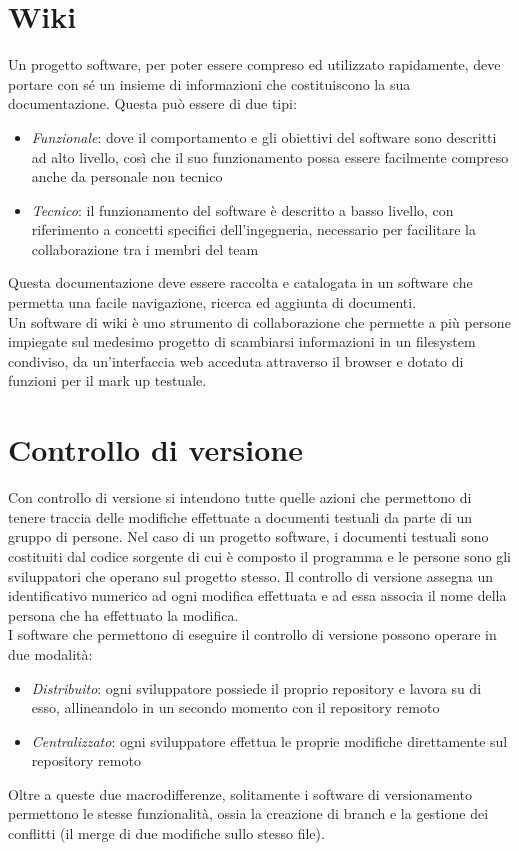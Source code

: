 \documentclass[a4paper, 12pt]{report}
\numberwithin{equation}{section}
\begin{document}
\section{Wiki}
Un progetto software, per poter essere compreso ed utilizzato rapidamente, deve portare con sé un insieme di informazioni che costituiscono la sua documentazione. Questa può essere di due tipi:
\begin{itemize}
    \item \emph{Funzionale}: dove il comportamento e gli obiettivi del software sono descritti ad alto livello, così che il suo funzionamento possa essere facilmente compreso anche da personale non tecnico
    \item \emph{Tecnico}: il funzionamento del software è descritto a basso livello, con riferimento a concetti specifici dell’ingegneria, necessario per facilitare la collaborazione tra i membri del team
\end{itemize}
Questa documentazione deve essere raccolta e catalogata in un software che permetta una facile navigazione, ricerca ed aggiunta di documenti.\\
Un software di wiki è uno strumento di collaborazione che permette a più persone impiegate sul medesimo progetto di scambiarsi informazioni in un filesystem condiviso, da un’interfaccia web acceduta attraverso il browser e dotato di funzioni per il mark up testuale.

\section{Controllo di versione}
Con controllo di versione si intendono tutte quelle azioni che permettono di tenere traccia delle modifiche effettuate a documenti testuali da parte di un gruppo di persone. Nel caso di un progetto software, i documenti testuali sono costituiti dal codice sorgente di cui è composto il programma e le persone sono gli sviluppatori che operano sul progetto stesso.
Il controllo di versione assegna un identificativo numerico ad ogni modifica effettuata e ad essa associa il nome della persona che ha effettuato la modifica.\\
I software che permettono di eseguire il controllo di versione possono operare in due modalità:
\begin{itemize}
    \item \emph{Distribuito}: ogni sviluppatore possiede il proprio repository e lavora su di esso, allineandolo in un secondo momento con il repository remoto
    \item \emph{Centralizzato}: ogni sviluppatore effettua le proprie modifiche direttamente sul repository remoto
\end{itemize}
Oltre a queste due macrodifferenze, solitamente i software di versionamento permettono le stesse funzionalità, ossia la creazione di branch e la gestione dei conflitti (il merge di due modifiche sullo stesso file).
\end{document}
